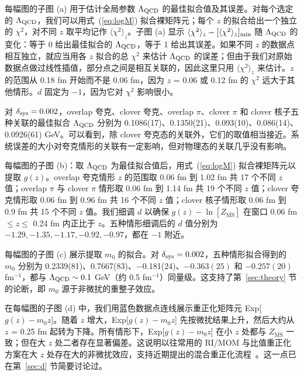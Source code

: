 每幅图的子图 (a) 用于估计全局参数 $\Lambda_{\rm QCD}$ 的最佳拟合值及其误差。对每个选定的 $\Lambda_{\rm QCD}$，我们可以用式~(\ref{eq:logM}) 拟合裸矩阵元；每个 $z$ 的拟合给出一个独立的 $\chi^{2}$，对不同 $z$ 取平均记作 $\langle  \chi^{2} \rangle_{z}$。子图 (a) 显示 $\langle  \chi^{2} \rangle_{z} - [\langle  \chi^{2} \rangle_{z}]_{\rm min}$ 随 $\Lambda_{\rm QCD}$ 的变化：等于 0 给出最佳拟合的 $\Lambda_{\rm QCD}$，等于 1 给出其误差。如果不同 $z$ 的数据点相互独立，就应当用各 $z$ 拟合的总 $\chi^{2}$ 来估计 $\Lambda_{\rm QCD}$ 的误差；但由于我们对原始数据点做过线性插值，部分点之间是相互关联的，因此这里只用 $\langle  \chi^{2} \rangle_{z}$ 来估计。$z$ 的范围从 0.18 fm 开始而不是 0.06 fm，因为 $z$ = 0.06 或 0.12 fm 的 $\chi^{2}$ 远大于其他情形。$d$ 固定为 $-1$，因为它对 $\chi^{2}$ 影响很小。

对 $\delta_{\rm sys}=0.002$，overlap 夸克、clover 夸克、overlap $\pi$、clover $\pi$ 和 clover 核子五种关联的最佳拟合 $\Lambda_{\rm QCD}$ 分别为 0.1086(17)、0.1350(21)、0.093(10)、0.086(14)、0.0926(61) GeV。可以看到，除 clover 夸克态的关联外，它们的取值相当接近。系统误差的大小对夸克情形的关联有一定影响，但对物理态的关联几乎没有影响。

每幅图的子图 (b)：取 $\Lambda_{\rm QCD}$ 为最佳拟合值后，用式~(\ref{eq:logM}) 拟合裸矩阵元以提取 $g(z)$。overlap 夸克情形 $z$ 的范围取 0.06 fm 到 1.02 fm 共 17 个不同 $z$ 值；overlap $\pi$ 与 clover $\pi$ 情形取 0.06 fm 到 1.14 fm 共 19 个不同 $z$ 值；clover 夸克情形取 0.06 fm 到 0.96 fm 共 16 个不同 $z$ 值；clover 核子情形取 0.06 fm 到 0.9 fm 共 15 个不同 $z$ 值。我们细调 $d$ 以确保 $g(z) - \ln[Z_{\overline{\mathrm{MS}}}]$ 在窗口 0.06 fm $\leq z \leq$ 0.24 fm 内正比于 $z$。五种情形细调后的 $d$ 值分别为 $-1.29, -1.35, -1.17, -0.92, -0.97$，都在 $-1$ 附近。

每幅图的子图 (c) 展示提取 $m_{0}$ 的拟合。对 $\delta_{\rm sys}=0.002$，五种情形拟合得到的 $m_{0}$ 分别为 0.2339(81)、0.7667(83)、$-$0.181(24)、$-0.363(25)$ 和 $-0.257(20)$ fm$^{-1}$，都与 $\Lambda_{\rm QCD} \sim 0.1$ GeV（约 0.5 fm$^{-1}$）同量级。这支持了第~\ref{sec:theory} 节的论断，即 $m_{0}$ 源于非微扰的重整子效应。

在每幅图的子图 (d) 中，我们用蓝色数据点连线展示重正化矩阵元 Exp[$g(z)-m_{0}z$]。随着 $z$ 增大，Exp[$g(z)-m_{0}z$] 先按微扰结果上升，然后大约从 $z$ = 0.25 fm 起转为下降。所有情形下，Exp[$g(z)-m_{0}z$] 在小 $z$ 处都与 $Z_{\overline{\mathrm{MS}}}$ 一致；但在大 $z$ 处二者存在显著偏差。这说明以往常用的 RI/MOM 与比值重正化方案在大 $z$ 处存在大的非微扰效应，支持近期提出的混合重正化流程~\cite{Ji:2020brr}。这一点已在第~\ref{sec:d} 节简要讨论过。

